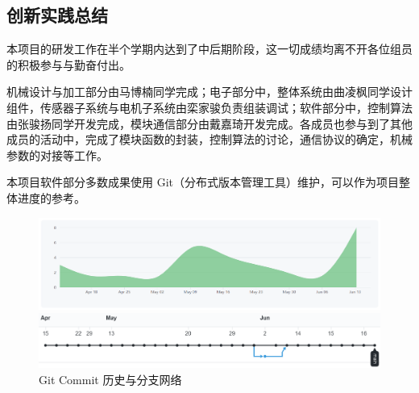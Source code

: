 \documentclass[a4paper]{ctexart}
\numberwithin{equation}{section}
\numberwithin{table}{section}
\numberwithin{figure}{section}
\begin{document}
\subsection{创新实践总结}

本项目的研发工作在半个学期内达到了中后期阶段，这一切成绩均离不开各位组员的积极参与与勤奋付出。

机械设计与加工部分由马博楠同学完成；电子部分中，整体系统由曲凌枫同学设计组件，传感器子系统与电机子系统由栾家骏负责组装调试；软件部分中，控制算法由张骏扬同学开发完成，模块通信部分由戴嘉琦开发完成。各成员也参与到了其他成员的活动中，完成了模块函数的封装，控制算法的讨论，通信协议的确定，机械参数的对接等工作。

本项目软件部分多数成果使用 Git（分布式版本管理工具）维护，可以作为项目整体进度的参考。

\begin{figure}[H]
  \begin{minipage}{0.98\linewidth}
    \begin{center}
      \includegraphics[width=0.98\linewidth]{figures/github.png}
    \end{center}
  \end{minipage}
  \vfill
  \begin{minipage}{0.98\linewidth}
    \begin{center}
      \includegraphics[width=0.98\linewidth]{figures/gitnetwork.png}
    \end{center}
  \end{minipage}
  \caption{Git Commit 历史与分支网络}
\end{figure}




\newpage
\thispagestyle{fancy}
\lhead{}
\chead{\it\small{\textcolor{grey}{参考文献}}}
\rhead{}
{}


\end{document}
